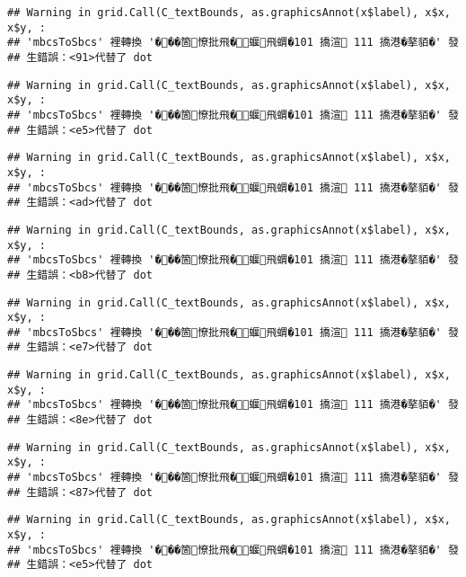 \documentclass[
]{article}
\begin{document}
\begin{verbatim}
## Warning in grid.Call(C_textBounds, as.graphicsAnnot(x$label), x$x, x$y, :
## 'mbcsToSbcs' 裡轉換 '���箇憭批飛�蝘飛蝟�101 撟渲 111 撟港�摮貊�' 發
## 生錯誤：<91>代替了 dot
\end{verbatim}

\begin{verbatim}
## Warning in grid.Call(C_textBounds, as.graphicsAnnot(x$label), x$x, x$y, :
## 'mbcsToSbcs' 裡轉換 '���箇憭批飛�蝘飛蝟�101 撟渲 111 撟港�摮貊�' 發
## 生錯誤：<e5>代替了 dot
\end{verbatim}

\begin{verbatim}
## Warning in grid.Call(C_textBounds, as.graphicsAnnot(x$label), x$x, x$y, :
## 'mbcsToSbcs' 裡轉換 '���箇憭批飛�蝘飛蝟�101 撟渲 111 撟港�摮貊�' 發
## 生錯誤：<ad>代替了 dot
\end{verbatim}

\begin{verbatim}
## Warning in grid.Call(C_textBounds, as.graphicsAnnot(x$label), x$x, x$y, :
## 'mbcsToSbcs' 裡轉換 '���箇憭批飛�蝘飛蝟�101 撟渲 111 撟港�摮貊�' 發
## 生錯誤：<b8>代替了 dot
\end{verbatim}

\begin{verbatim}
## Warning in grid.Call(C_textBounds, as.graphicsAnnot(x$label), x$x, x$y, :
## 'mbcsToSbcs' 裡轉換 '���箇憭批飛�蝘飛蝟�101 撟渲 111 撟港�摮貊�' 發
## 生錯誤：<e7>代替了 dot
\end{verbatim}

\begin{verbatim}
## Warning in grid.Call(C_textBounds, as.graphicsAnnot(x$label), x$x, x$y, :
## 'mbcsToSbcs' 裡轉換 '���箇憭批飛�蝘飛蝟�101 撟渲 111 撟港�摮貊�' 發
## 生錯誤：<8e>代替了 dot
\end{verbatim}

\begin{verbatim}
## Warning in grid.Call(C_textBounds, as.graphicsAnnot(x$label), x$x, x$y, :
## 'mbcsToSbcs' 裡轉換 '���箇憭批飛�蝘飛蝟�101 撟渲 111 撟港�摮貊�' 發
## 生錯誤：<87>代替了 dot
\end{verbatim}

\begin{verbatim}
## Warning in grid.Call(C_textBounds, as.graphicsAnnot(x$label), x$x, x$y, :
## 'mbcsToSbcs' 裡轉換 '���箇憭批飛�蝘飛蝟�101 撟渲 111 撟港�摮貊�' 發
## 生錯誤：<e5>代替了 dot
\end{verbatim}
\end{document}
